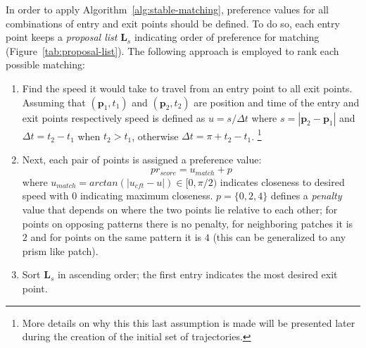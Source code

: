 In order to apply Algorithm~\ref{alg:stable-matching}, preference values for all combinations of entry and exit points should be defined.
To do so, each entry point keeps a \emph{proposal list} $\mathbf{L}_s$ indicating order of preference for matching (Figure~\ref{tab:proposal-list}).
The following approach is employed to rank each possible matching:
\begin{enumerate}
  \item Find the speed it would take to travel from an entry point to all exit points.
  Assuming that $(\mathbf{p}_1, t_1)$ and $(\mathbf{p}_2,t_2)$ are position and time of the entry and exit points respectively
  speed is defined as $u = s / {\Delta}t$ where $s=|\mathbf{p}_2-\mathbf{p}_1|$ and ${\Delta}t = t_2 - t_1$ when $t_2 > t_1$, otherwise ${\Delta}t=\pi + t_2 - t_1$.
  \footnote{More details on why this this last assumption is made will be presented later during the creation of the initial set of trajectories.}
  \item %
  Next, each pair of points is assigned a preference value:
  \begin{equation}
  	pr_{score} = u_{match} + p
  	\label{eqn:objective_function}
  \end{equation}
  where
  		$u_{match} = arctan(|u_{cft} - u|) \in [0, \pi / 2)$ indicates closeness to desired speed with $0$ indicating maximum closeness. 
    	$p = \{0, 2, 4\}$ defines a \emph{penalty} value that depends on where the two points lie relative to each other; for points on opposing patterns there is no penalty, for neighboring patches it is $2$ and for points on the same pattern it is $4$ (this can be generalized to any prism like patch). 

  \item Sort $\mathbf{L}_s$ in ascending order; the first entry indicates the most desired exit point.
\end{enumerate}
 

